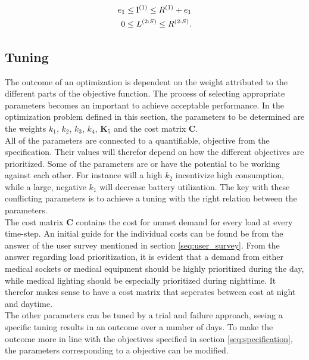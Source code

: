 \begin{align}
    e_1 &\leq \mathbf{l}^{(1)} \leq R^{(1)} + e_1\notag\\
    0 &\leq L^{(2:S)} \leq R^{(2:S)}.   
\end{align}

\subsection{Tuning}
The outcome of an optimization is dependent on the weight attributed to the different parts of the objective function. The process of selecting appropriate parameters becomes an important to achieve acceptable performance. In the optimization problem defined in this section, the parameters to be determined are the weights $k_1$, $k_2$, $k_3$, $k_4$, $\mathbf{K}_5$ and the cost matrix \textbf{C}.\\ 

All of the parameters are connected to a quantifiable, objective from the specification. Their values will therefor depend on how the different objectives are prioritized. Some of the parameters are or have the potential to be working against each other. For instance will a high $k_2$ incentivize high consumption, while a large, negative $k_1$ will decrease battery utilization. The key with these conflicting parameters is to achieve a tuning with the right relation between the parameters.\\

The cost matrix \textbf{C} contains the cost for unmet demand for every load at every time-step. An initial guide for the individual costs can be found be from the answer of the user survey mentioned in section \ref{seq:user_survey}. From the answer regarding load prioritization, it is evident that a demand from either medical sockets or medical equipment should be highly prioritized during the day, while medical lighting should be especially prioritized during nighttime. It therefor makes sense to have a cost matrix that seperates between cost at night and daytime.\\

The other parameters can be tuned by a trial and failure approach, seeing a specific tuning results in an outcome over a number of days. To make the outcome more in line with the objectives specified in section \ref{seq:specification}, the parameters corresponding to a objective can be modified.\\


